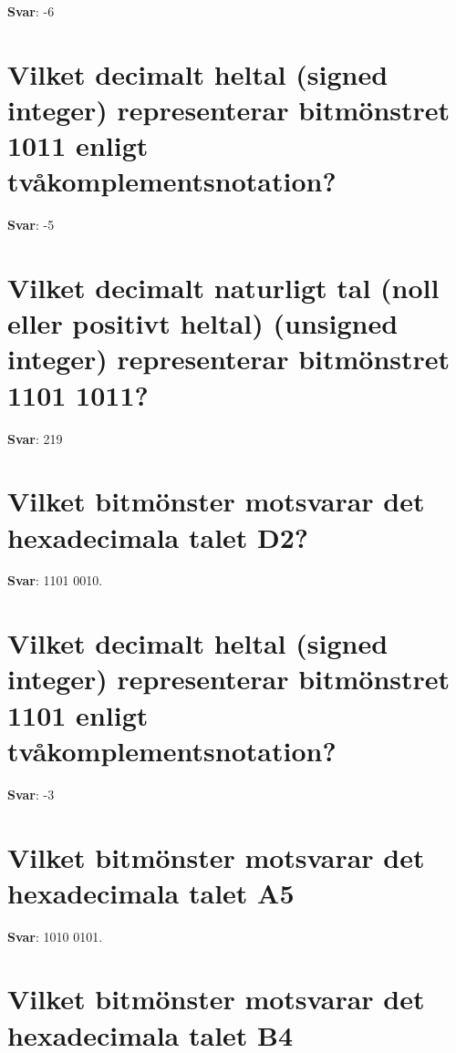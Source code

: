 \documentclass[a4paper,11pt,oneside]{book}
\begin{document}
\begin{sloppypar}
\label{q:377:sa:sv:True}

\textbf{Svar}: -6



\section{Vilket decimalt heltal (signed integer) representerar bitm\"onstret 1011 enligt tv\r{a}komplementsnotation?}

\label{q:378:sa:sv:True}

\textbf{Svar}: -5



\section{Vilket decimalt naturligt tal (noll eller positivt heltal) (unsigned integer) representerar bitm\"onstret 1101 1011?}

\label{q:379:sa:sv:True}

\textbf{Svar}: 219



\section{Vilket bitm\"onster motsvarar det hexadecimala talet D2?}

\label{q:380:sa:sv:True}

\textbf{Svar}: 1101 0010.



\section{Vilket decimalt heltal (signed integer) representerar bitm\"onstret 1101 enligt tv\r{a}komplementsnotation?}

\label{q:381:sa:sv:True}

\textbf{Svar}: -3



\section{Vilket bitm\"onster motsvarar det hexadecimala talet A5}

\label{q:382:sa:sv:True}

\textbf{Svar}: 1010 0101.



\section{Vilket bitm\"onster motsvarar det hexadecimala talet B4}


\end{sloppypar}
\end{document}
